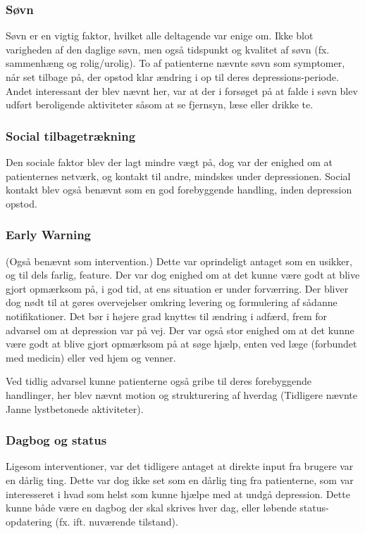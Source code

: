 \subsubsection{Søvn}
Søvn er en vigtig faktor, hvilket alle deltagende var enige om.
Ikke blot varigheden af den daglige søvn, men også tidspunkt og kvalitet af søvn (fx. sammenhæng og rolig/urolig).
To af patienterne nævnte søvn som symptomer, når set tilbage på, der opstod klar ændring i op til deres depressions-periode.
Andet interessant der blev nævnt her, var at der i forsøget på at falde i søvn blev udført beroligende aktiviteter såsom at se fjernsyn, læse eller drikke te.

\subsubsection{Social tilbagetrækning}
Den sociale faktor blev der lagt mindre vægt på, dog var der enighed om at patienternes netværk, og kontakt til andre, mindskes under depressionen.
Social kontakt blev også benævnt som en god forebyggende handling, inden depression opstod.

\subsubsection{Early Warning}
(Også benævnt som intervention.)
Dette var oprindeligt antaget som en usikker, og til dels farlig, feature.
Der var dog enighed om at det kunne være godt at blive gjort opmærksom på, i god tid, at ens situation er under forværring.
Der bliver dog nødt til at gøres overvejelser omkring levering og formulering af sådanne notifikationer.
Det bør i højere grad knyttes til ændring i adfærd, frem for advarsel om at depression var på vej.
Der var også stor enighed om at det kunne være godt at blive gjort opmærksom på at søge hjælp, enten ved læge (forbundet med medicin) eller ved hjem og venner.

Ved tidlig advarsel kunne patienterne også gribe til deres forebyggende handlinger, her blev nævnt motion og strukturering af hverdag 
(Tidligere nævnte Janne lystbetonede aktiviteter).

\subsubsection{Dagbog og status}
Ligesom interventioner, var det tidligere antaget at direkte input fra brugere var en dårlig ting.
Dette var dog ikke set som en dårlig ting fra patienterne, som var interesseret i hvad som helst som kunne hjælpe med at undgå depression.
Dette kunne både være en dagbog der skal skrives hver dag, eller løbende status-opdatering (fx. ift. nuværende tilstand).

